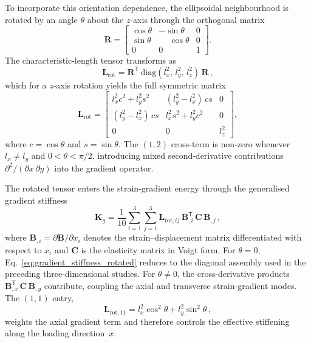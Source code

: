 \documentclass[final,3p,times,fleqn]{elsarticle}
\begin{document}
To incorporate this orientation dependence, the ellipsoidal
neighbourhood is rotated by an angle $\theta$ about the $z$-axis through
the orthogonal matrix
\begin{equation}
\mathbf{R} =
\begin{bmatrix}
\cos\theta & -\sin\theta & 0 \\
\sin\theta & \phantom{-}\cos\theta & 0 \\
0     & 0           & 1
\end{bmatrix}.
\label{eq:rotation_matrix}
\end{equation}
The characteristic-length tensor transforms as
\begin{equation}
\mathbf{L}_{\mathrm{rot}}
= \mathbf{R}^{\mathsf{T}}\,
\mathrm{diag}(l_{x}^{2},\, l_{y}^{2},\, l_{z}^{2})\,
\mathbf{R}\,,
\label{eq:AAT_rot}
\end{equation}
which for a $z$-axis rotation yields the full symmetric matrix
\begin{equation}
\mathbf{L}_{\mathrm{rot}}
= \begin{bmatrix}
l_{x}^{2}c^{2} + l_{y}^{2}s^{2}
 & (l_{y}^{2}-l_{x}^{2})\,cs & 0 \\[4pt]
(l_{y}^{2}-l_{x}^{2})\,cs
 & l_{x}^{2}s^{2} + l_{y}^{2}c^{2} & 0 \\[4pt]
0 & 0 & l_{z}^{2}
\end{bmatrix},
\label{eq:AAT_rot_explicit}
\end{equation}
where $c = \cos\theta$ and $s = \sin\theta$.
The $(1,2)$ cross-term is non-zero whenever $l_{x}\neq l_{y}$ and
$0 < \theta < \pi/2$, introducing mixed second-derivative contributions
$\partial^{2}/(\partial x\,\partial y)$ into the gradient operator.

The rotated tensor enters the strain-gradient energy through the
generalised gradient stiffness
\begin{equation}
\mathbf{K}_{g}
= \frac{1}{10}\sum_{i=1}^{3}\sum_{j=1}^{3}
\mathbf{L}_{\mathrm{rot},ij}\,
\mathbf{B}_{,i}^{\mathsf{T}}\,\mathbf{C}\,\mathbf{B}_{,j}\,,
\label{eq:gradient_stiffness_rotated}
\end{equation}
where $\mathbf{B}_{,i}=\partial\mathbf{B}/\partial x_{i}$ denotes the strain--displacement matrix differentiated with respect to $x_{i}$ and $\mathbf{C}$ is the elasticity matrix in Voigt form.
For $\theta = 0$, Eq.~\eqref{eq:gradient_stiffness_rotated} reduces to
the diagonal assembly used in the preceding three-dimensional studies.
For $\theta\neq 0$, the cross-derivative products
$\mathbf{B}_{,x}^{\mathsf{T}}\,\mathbf{C}\,\mathbf{B}_{,y}$ contribute,
coupling the axial and transverse strain-gradient modes.
The $(1,1)$ entry,
\begin{equation}
\mathbf{L}_{\mathrm{rot},11}
= l_{x}^{2}\cos^{2}\theta + l_{y}^{2}\sin^{2}\theta\,,
\label{eq:AAT_rot_11}
\end{equation}
weights the axial gradient term and therefore controls the effective
stiffening along the loading direction~$x$.
\end{document}

